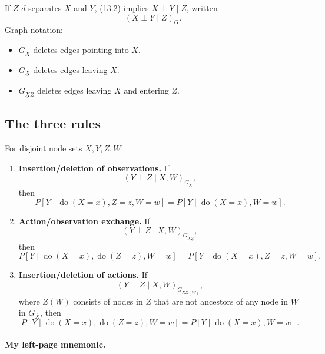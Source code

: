If $Z$ $d$-separates $X$ and $Y$, (13.2) implies $X\perp Y\mid Z$, written
\[
 (X\perp Y\mid Z)_G.
\]
Graph notation:
\begin{itemize}
 \item $G_{\overline X}$ deletes edges pointing into $X$.
 \item $G_{\underline X}$ deletes edges leaving $X$.
 \item $G_{\underline X\overline Z}$ deletes edges leaving $X$ and entering $Z$.
\end{itemize}

\subsection{The three rules}
 For disjoint node sets $X,Y,Z,W$:
\begin{enumerate}
 \item \textbf{Insertion/deletion of observations.} If
 \[(Y\perp Z\mid X,W)_{G_{\overline X}},\]
 then
 \[
 P[Y\mid\operatorname{do}(X=x),Z=z,W=w]
 =P[Y\mid\operatorname{do}(X=x),W=w].
 \]
 \item \textbf{Action/observation exchange.} If
 \[(Y\perp Z\mid X,W)_{G_{\overline X\underline Z}},\]
 then
 \[
 P[Y\mid\operatorname{do}(X=x),\operatorname{do}(Z=z),W=w]
 =P[Y\mid\operatorname{do}(X=x),Z=z,W=w].
 \]
 \item \textbf{Insertion/deletion of actions.} If
 \[(Y\perp Z\mid X,W)_{G_{\overline X\overline{Z(W)}}},\]
 where $Z(W)$ consists of nodes in $Z$ that are not ancestors of any node in $W$ in $G_{\overline X}$, then
 \[
 P[Y\mid\operatorname{do}(X=x),\operatorname{do}(Z=z),W=w]
 =P[Y\mid\operatorname{do}(X=x),W=w].
 \]
\end{enumerate}
\paragraph{My left-page mnemonic.}

